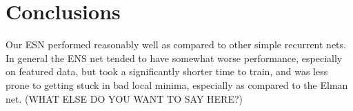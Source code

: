 \documentclass{acm_proc_article-sp}
\begin{document}
\section{Conclusions}
Our ESN performed reasonably well as compared to other simple recurrent nets. In general the ENS net tended to have somewhat worse performance, especially on featured data, but took a significantly shorter time to train, and was less prone to getting stuck in bad local minima, especially as compared to the Elman net. 
(WHAT ELSE DO YOU WANT TO SAY HERE?)
\end{document}
